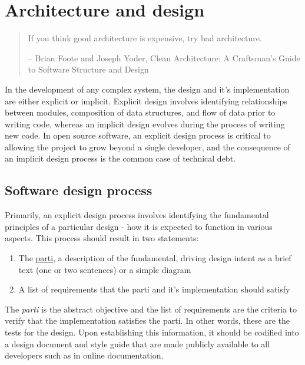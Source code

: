 \documentclass[]{nrel}
\begin{document}
\section{Architecture and design}

\begin{quote}
    If you think good architecture is expensive, try bad architecture.

    -- Brian Foote and Joseph Yoder, Clean Architecture: A Craftsman's Guide to Software Structure and Design
\end{quote}

In the development of any complex system, the design and it's implementation are either
explicit or implicit.
Explicit design involves identifying relationships between modules, composition of data
structures, and flow of data prior to writing code, whereas an implicit design evolves during the
process of writing new code.
In open source software, an explicit design process is critical to allowing the project
to grow beyond a single developer, and the consequence of an implicit design process
is the common case of technical debt.

\subsection{Software design process}

Primarily, an explicit design process involves identifying the fundamental principles
of a particular design - how it is expected to function in various aspects.
This process should result in two statements:

\begin{enumerate}
\item The \href{https://en.wikipedia.org/wiki/Parti_(architecture)}{parti}, a description of the
    fundamental, driving design intent as a brief text (one or two sentences) or a
    simple diagram
\item A list of requirements that the parti and it's implementation should satisfy
\end{enumerate}

The \textit{parti} is the abstract objective and the list of requirements are the criteria
to verify that the implementation satisfies the parti.
In other words, these are the tests for the design.
Upon establishing this information, it should be codified into a design document and style
guide that are made publicly available to all developers such as in online documentation.
\end{document}
